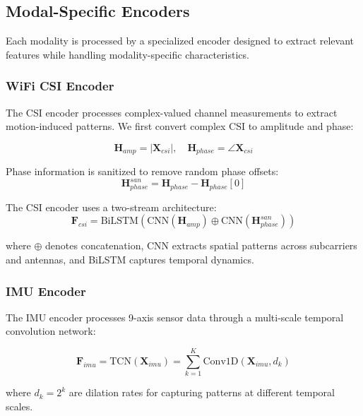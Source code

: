 \documentclass[10pt,twocolumn]{article}
\begin{document}
\subsection{Modal-Specific Encoders}

Each modality is processed by a specialized encoder designed to extract relevant features while handling modality-specific characteristics.

\subsubsection{WiFi CSI Encoder}

The CSI encoder processes complex-valued channel measurements to extract motion-induced patterns. We first convert complex CSI to amplitude and phase:

\begin{equation}
\mathbf{H}_{amp} = |\mathbf{X}_{csi}|, \quad \mathbf{H}_{phase} = \angle\mathbf{X}_{csi}
\end{equation}

Phase information is sanitized to remove random phase offsets:
\begin{equation}
\mathbf{H}_{phase}^{san} = \mathbf{H}_{phase} - \mathbf{H}_{phase}[0]
\end{equation}

The CSI encoder uses a two-stream architecture:
\begin{equation}
\mathbf{F}_{csi} = \text{BiLSTM}(\text{CNN}(\mathbf{H}_{amp}) \oplus \text{CNN}(\mathbf{H}_{phase}^{san}))
\end{equation}

where $\oplus$ denotes concatenation, CNN extracts spatial patterns across subcarriers and antennas, and BiLSTM captures temporal dynamics.

\subsubsection{IMU Encoder}

The IMU encoder processes 9-axis sensor data through a multi-scale temporal convolution network:

\begin{equation}
\mathbf{F}_{imu} = \text{TCN}(\mathbf{X}_{imu}) = \sum_{k=1}^{K} \text{Conv1D}(\mathbf{X}_{imu}, d_k)
\end{equation}

where $d_k = 2^k$ are dilation rates for capturing patterns at different temporal scales.
\end{document}
